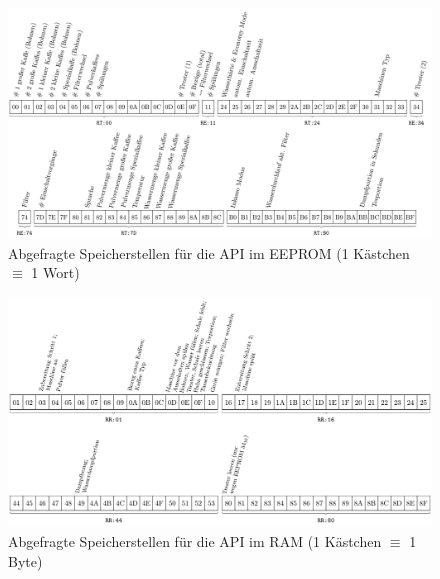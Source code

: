 \begin{figure}
  \begin{center}
    \includegraphics[scale=0.94]{images/chapter_5/API-EEPROM}
    \caption{Abgefragte Speicherstellen für die API im EEPROM (1 Kästchen $\equiv$ 1 Wort)}
    \label{fig:API-EEPROM}
  \end{center}
\end{figure}
\begin{figure}
  \begin{center}
    \includegraphics[scale=1]{images/chapter_5/API-RAM}
    \caption{Abgefragte Speicherstellen für die API im RAM (1 Kästchen $\equiv$ 1 Byte)}
    \label{fig:API-RAM}
  \end{center}
\end{figure}

